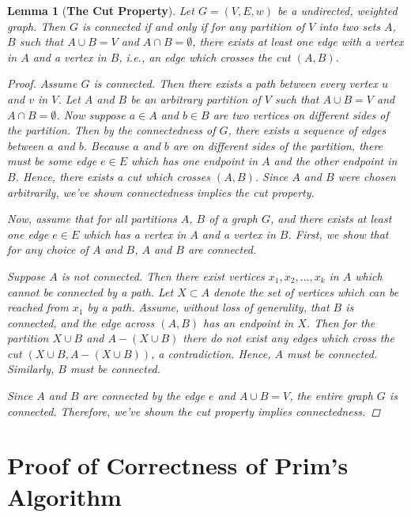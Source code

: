 \documentclass[a4paper,11pt]{report}
\theoremstyle{plain}
\newtheorem{lem}[thm]{Lemma}
\theoremstyle{definition}
\begin{document}
\begin{lem}[{\bfseries The Cut Property}]
Let $G = (V, E, w)$ be a undirected, weighted graph. Then $G$ is connected
if and only if for any partition of $V$ into two sets $A$, $B$ such that
$A \cup B = V$ and $A \cap B = \emptyset$, there exists at least
one edge with a vertex in $A$ and a vertex in $B$, i.e., an edge which
crosses the cut $(A, B)$.

\begin{proof}
Assume $G$ is connected. Then there exists a path between every vertex $u$ and
$v$ in $V$. Let $A$ and $B$ be an arbitrary partition of $V$ such that
$A \cup B = V$ and $A \cap B = \emptyset$. Now suppose $a \in A$ and $b \in B$
are two vertices on different sides of the partition. Then by the connectedness
of $G$, there exists a sequence of edges between $a$ and $b$. Because $a$ and
$b$ are on different sides of the partition, there must be some edge $e \in E$
which has one endpoint in $A$ and the other endpoint in $B$. Hence, there
exists a cut which crosses $(A, B)$. Since $A$ and $B$ were chosen arbitrarily,
we've shown connectedness implies the cut property.

Now, assume that for all partitions $A$, $B$ of a graph $G$, and there
exists at least one edge $e \in E$ which has a vertex in $A$ and a vertex in
$B$. First, we show that for any choice of $A$ and $B$, $A$ and $B$ are
connected.

Suppose $A$ is not connected. Then there exist vertices $x_1, x_2, \ldots, x_k$
in $A$ which cannot be connected by a path. Let $X \subset A$ denote the
set of vertices which can be reached from $x_1$ by a path. Assume, without loss
of generality, that $B$ is connected, and the edge across $(A, B)$ has an
endpoint in $X$. Then for the partition $X \cup B$ and $A - (X \cup B)$ there
do not exist any edges which cross the cut $(X \cup B, A - (X \cup B))$, a
contradiction. Hence, $A$ must be connected. Similarly, $B$ must be connected.

Since $A$ and $B$ are connected by the edge $e$ and $A \cup B = V$, the entire
graph $G$ is connected. Therefore, we've shown the cut property implies
connectedness.
\end{proof}
\end{lem}

\section{Proof of Correctness of Prim's Algorithm}
\end{document}
